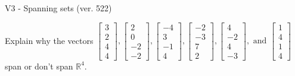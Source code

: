 \begin{exercise}
  \begin{exerciseTitle}V3 - Spanning sets (ver. 522)\end{exerciseTitle}
  \begin{exerciseStatement}
    Explain why the vectors \(\left[\begin{array}{r}
3 \\
2 \\
4 \\
4
\end{array}\right] , \left[\begin{array}{r}
2 \\
0 \\
-2 \\
-2
\end{array}\right] , \left[\begin{array}{r}
-4 \\
3 \\
-1 \\
4
\end{array}\right] , \left[\begin{array}{r}
-2 \\
-3 \\
7 \\
2
\end{array}\right] , \left[\begin{array}{r}
4 \\
-2 \\
4 \\
-3
\end{array}\right] , \text{ and } \left[\begin{array}{r}
1 \\
4 \\
1 \\
4
\end{array}\right]\) span or don't span \(\mathbb{R}^4\). 
	



\end{exerciseStatement}
\end{exercise}
